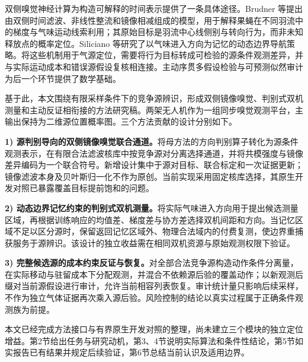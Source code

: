 双侧嗅觉神经计算为构造可解释的时间表示提供了一条具体途径。Brudner 等提出由双侧时间滤波、非线性整流和镜像相减组成的模型，用于解释果蝇在不同羽流中的梯度与气味运动线索利用；其原始目标是羽流中心线侧别与转向行为，而非未知释放点的概率定位。Siliciano 等研究了以气味进入方向为记忆的动态边界导航策略。将这些机制用于气源定位，需要将行为目标转成可检验的源条件观测差异，并与实际运动成本和错误源假设复核相连接。主动序贯多假设检验与可预测似然审计为后一个环节提供了数学基础。

基于此，本文围绕有限采样条件下的竞争源辨识，形成双侧镜像嗅觉、判别式双机测量和主动反证相衔接的方法研究稿。两架无人机作为一组同步嗅觉观测平台，主输出保持为二维源位置概率图。三个方法贡献的设计分别如下。

\textbf{1) 源判别导向的双侧镜像嗅觉联合通道。}将母方法的方向判别算子转化为源条件观测表示，在有限合法滤波核库中按竞争源对分离选择通道，并将共模强度与镜像差异编码为一个联合符号。新增设计集中于源对目标、联合标定和一次证据更新；镜像滤波本身及贝叶斯归一化不作为原创。当前实现采用固定核库选择，其原生开发对照已暴露覆盖目标提前饱和的问题。

\textbf{2) 动态边界记忆约束的判别式双机测量。}将实际气味进入方向用于提出候选测量区域，再根据训练响应的均值差、梯度差与协方差选择双机间距和方向。当记忆区域不足以区分源时，保留返回记忆区域外、物理合法域内的付费复测，使边界重捕获服务于源辨识。该设计的独立收益需在相同双机资源与原始观测权限下验证。

\textbf{3) 完整候选源的成本约束反证与恢复。}对全部合法竞争源构造动作条件分离量，在实际移动与驻留成本下分配观测，并混合不依赖源后验的覆盖动作；以新观测后缀对当前源假设进行审计，允许当前相容列表恢复。审计统计量只影响后续采样，不作为独立气体证据再次乘入源后验。风险控制的结论以真实过程属于正确条件观测族为前提。

本文已经完成方法接口与有界原生开发对照的整理，尚未建立三个模块的独立定位增益。第2节给出任务与研究动机，第3、4节说明实际算法和条件性结论，第5节如实报告已有结果并规定后续验证，第6节总结当前认识及适用边界。
